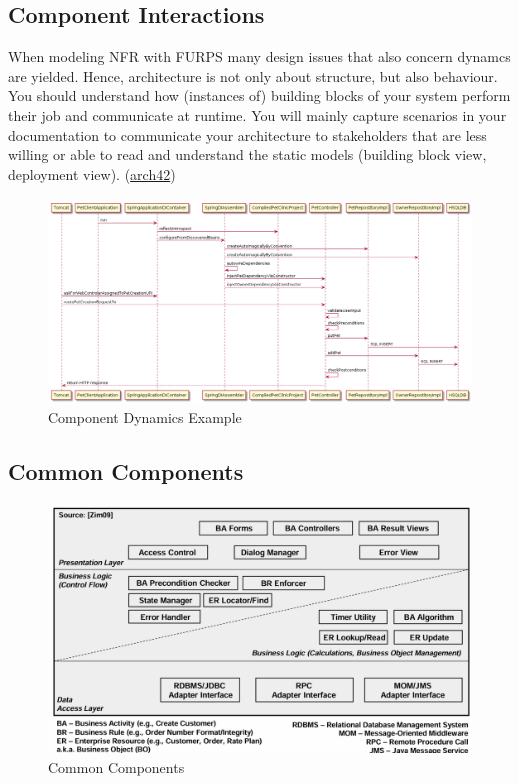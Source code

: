 \documentclass[../Main.tex]{subfiles}
\begin{document}
\subsection{Component Interactions}
When modeling NFR with FURPS many design issues that also
concern dynamcs are yielded. Hence, architecture is not only
about structure, but also behaviour.
You should understand how (instances of) building blocks of
your system perform their job and communicate at runtime.
You will mainly capture scenarios in your documentation
to communicate your architecture to stakeholders that are
less willing or able to read and understand the static models
(building block view, deployment view). (\href{http://docs.arc42.org/section-6/}{arch42})

\begin{figure}[H]
    \centering
    \includegraphics[width=1\linewidth]{Images/component-dynamics.png}
    \caption{Component Dynamics Example}
\end{figure}

\subsection{Common Components}
\begin{figure}[H]
    \centering
    \includegraphics[width=1\linewidth]{Images/commoncomponents.png}
    \caption{Common Components}
\end{figure}
\end{document}
